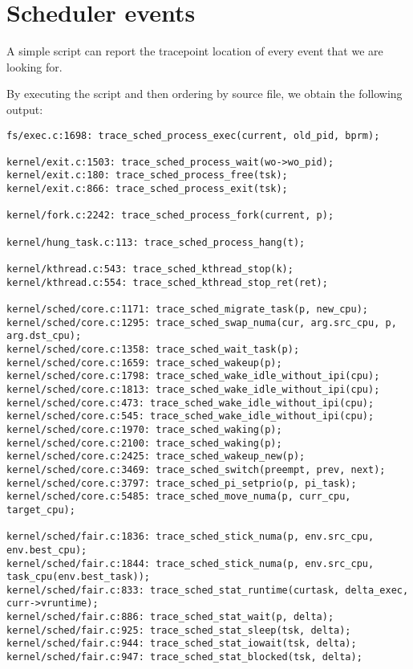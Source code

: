 \chapter{Scheduler events}
\label{ch:events_documentation}
A simple script can report the tracepoint location of every event that we are looking for.
By executing the script and then ordering by source file, we obtain the following output:

\begin{Verbatim}[xleftmargin=-0.5cm,fontsize=\footnotesize]
fs/exec.c:1698: trace_sched_process_exec(current, old_pid, bprm);

kernel/exit.c:1503: trace_sched_process_wait(wo->wo_pid);
kernel/exit.c:180: trace_sched_process_free(tsk);
kernel/exit.c:866: trace_sched_process_exit(tsk);

kernel/fork.c:2242: trace_sched_process_fork(current, p);

kernel/hung_task.c:113: trace_sched_process_hang(t);

kernel/kthread.c:543: trace_sched_kthread_stop(k);
kernel/kthread.c:554: trace_sched_kthread_stop_ret(ret);

kernel/sched/core.c:1171: trace_sched_migrate_task(p, new_cpu);
kernel/sched/core.c:1295: trace_sched_swap_numa(cur, arg.src_cpu, p, arg.dst_cpu);
kernel/sched/core.c:1358: trace_sched_wait_task(p);
kernel/sched/core.c:1659: trace_sched_wakeup(p);
kernel/sched/core.c:1798: trace_sched_wake_idle_without_ipi(cpu);
kernel/sched/core.c:1813: trace_sched_wake_idle_without_ipi(cpu);
kernel/sched/core.c:473: trace_sched_wake_idle_without_ipi(cpu);
kernel/sched/core.c:545: trace_sched_wake_idle_without_ipi(cpu);
kernel/sched/core.c:1970: trace_sched_waking(p);
kernel/sched/core.c:2100: trace_sched_waking(p);
kernel/sched/core.c:2425: trace_sched_wakeup_new(p);
kernel/sched/core.c:3469: trace_sched_switch(preempt, prev, next);
kernel/sched/core.c:3797: trace_sched_pi_setprio(p, pi_task);
kernel/sched/core.c:5485: trace_sched_move_numa(p, curr_cpu, target_cpu);

kernel/sched/fair.c:1836: trace_sched_stick_numa(p, env.src_cpu, env.best_cpu);
kernel/sched/fair.c:1844: trace_sched_stick_numa(p, env.src_cpu, task_cpu(env.best_task));
kernel/sched/fair.c:833: trace_sched_stat_runtime(curtask, delta_exec, curr->vruntime);
kernel/sched/fair.c:886: trace_sched_stat_wait(p, delta);
kernel/sched/fair.c:925: trace_sched_stat_sleep(tsk, delta);
kernel/sched/fair.c:944: trace_sched_stat_iowait(tsk, delta);
kernel/sched/fair.c:947: trace_sched_stat_blocked(tsk, delta);
\end{Verbatim}
